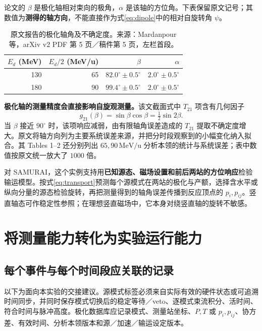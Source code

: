 \documentclass[UTF8,11pt,a4paper,fontset=none]{ctexart}
\newcommand{\unit}[1]{\,\mathrm{#1}}
\newcommand{\src}[2]{\cite[#2]{#1}}
\begin{document}
论文的 $\beta$ 是极化轴相对束向的极角，$\alpha$ 是该轴的方位角。下表保留原文记号；其数值为\textbf{测得的轴方向}，不能直接作为式\eqref{eq:dipole}中的相对自旋转角 $\psi$。

\begin{table}[H]\centering
\begin{tabular}{rrrr}\toprule
$E_d$ (MeV) & $E_d/2$ (MeV/u) & $\beta$ & $\alpha$ \\\midrule
130 & 65 & $82.0^\circ\pm0.5^\circ$ & $2.0^\circ\pm0.5^\circ$ \\
180 & 90 & $99.4^\circ\pm0.5^\circ$ & $2.0^\circ\pm0.5^\circ$ \\\bottomrule
\end{tabular}
\caption{原文报告的极化轴角及不确定度。来源：Mardanpour 等\cite{Mardanpour2007}，arXiv v2 PDF 第 5 页／稿件第 5 页，左栏首段。}
\label{tab:axis-check}
\end{table}

\textbf{极化轴的测量精度会直接影响自旋观测量。}该文截面式中 $T_{21}$ 项含有几何因子
\begin{equation}
g_{21}(\beta)=\sin\beta\cos\beta=\tfrac12\sin2\beta.
\end{equation}
当 $\beta$ 接近 $90^\circ$ 时，该项响应减弱，由有限轴角误差造成的 $T_{21}$ 提取不确定度增大。原文将轴方向列为主要系统误差来源，并把分时段观察到的小幅变化纳入拟合。其 Tables 1--2 还分别列出 $65,90\unit{MeV/u}$ 分析本领的统计与系统误差；表中数值按原文统一放大了 $1000$ 倍。\src{Mardanpour2007}{PDF 2，Eq. (1)；PDF 5，左栏；PDF 9，Tables 1--2}

对 SAMURAI，这个实例支持用\textbf{已知源态、磁场设置和前后两站的方位响应}检验输运模型。按式\eqref{eq:transport}预测每个源模式在两站的极化与产额，选择含水平或纵向分量的源态检验旋转，再把测量得到的轴角误差传播到反应顶点的 $p_i,p_{ij}$。竖直轴态可作稳定性参照；在理想竖直磁场中，它本身对绕竖直轴的旋转不敏感。

\clearpage
\section{将测量能力转化为实验运行能力}

\subsection{每个事件与每个时间段应关联的记录}
以下为面向本实验的交接建议。源模式标签必须来自实际有效的硬件状态或可追溯时间同步，并同时保存模式切换后的稳定等待／veto、逐模式束流积分、活时间、符合时间与脉冲高度。极化数据库应记录模式、测量站坐标、$P,T$ 或 $p_i,p_{ij}$、协方差、有效时间、分析本领版本和源／加速／输运设定版本。
\end{document}
